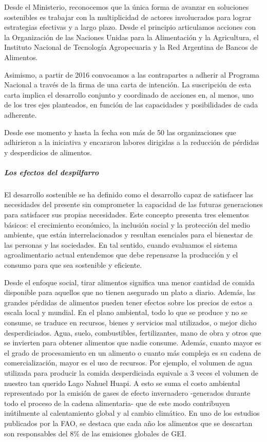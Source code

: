 \documentclass[
]{article}
\begin{document}
Desde el Ministerio, reconocemos que la única forma de avanzar en
soluciones sostenibles es trabajar con la multiplicidad de actores
involucrados para lograr estrategias efectivas y a largo plazo. Desde el
principio articulamos acciones con la Organización de las Naciones
Unidas para la Alimentación y la Agricultura, el Instituto Nacional de
Tecnología Agropecuaria y la Red Argentina de Bancos de Alimentos.

Asimismo, a partir de 2016 convocamos a las contrapartes a adherir al
Programa Nacional a través de la firma de una carta de intención. La
suscripción de esta carta implica el desarrollo conjunto y coordinado de
acciones en, al menos, uno de los tres ejes planteados, en función de
las capacidades y posibilidades de cada adherente.

Desde ese momento y hasta la fecha son más de 50 las organizaciones que
adhirieron a la iniciativa y encararon labores dirigidas a la reducción
de pérdidas y desperdicios de alimentos.

\hypertarget{los-efectos-del-despilfarro}{%
\subparagraph{Los efectos del
despilfarro}\label{los-efectos-del-despilfarro}}

El desarrollo sostenible se ha definido como el desarrollo capaz de
satisfacer las necesidades del presente sin comprometer la capacidad de
las futuras generaciones para satisfacer sus propias necesidades. Este
concepto presenta tres elementos básicos: el crecimiento económico, la
inclusión social y la protección del medio ambiente, que están
interrelacionados y resultan esenciales para el bienestar de las
personas y las sociedades. En tal sentido, cuando evaluamos el sistema
agroalimentario actual entendemos que debe repensarse la producción y el
consumo para que sea sostenible y eficiente.

Desde el enfoque social, tirar alimentos significa una menor cantidad de
comida disponible para aquellos que no tienen asegurado un plato a
diario. Además, las grandes pérdidas de alimentos pueden tener efectos
sobre los precios de estos a escala local y mundial. En el plano
ambiental, todo lo que se produce y no se consume, se traduce en
recursos, bienes y servicios mal utilizados, o mejor dicho
desperdiciados. Agua, suelo, combustibles, fertilizantes, mano de obra y
otros que se invierten para obtener alimentos que nadie consume. Además,
cuanto mayor es el grado de procesamiento en un alimento o cuanto más
compleja es su cadena de comercialización, mayor es el uso de recursos.
Por ejemplo, el volumen de agua utilizada para producir la comida
desperdiciada equivale a 3 veces el volumen de nuestro tan querido Lago
Nahuel Huapi. A esto se suma el costo ambiental representado por la
emisión de gases de efecto invernadero -generados durante todo el
proceso de la cadena alimentaria- que de este modo contribuyen
inútilmente al calentamiento global y al cambio climático. En uno de los
estudios publicados por la FAO, se destaca que cada año los alimentos
que se descartan son responsables del 8\% de las emisiones globales de
GEI.
\end{document}
